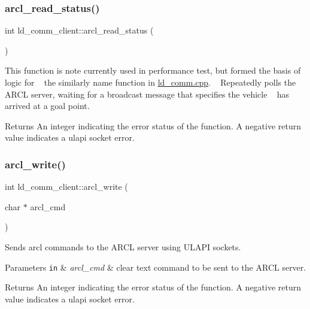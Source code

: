 \subsubsection{\texorpdfstring{arcl\+\_\+read\+\_\+status()}{arcl\_read\_status()}}
{\footnotesize\ttfamily int ld\+\_\+comm\+\_\+client\+::arcl\+\_\+read\+\_\+status (\begin{DoxyParamCaption}{ }\end{DoxyParamCaption})}

This function is note currently used in performance test, but formed the basis of logic for ~\newline
the similarly name function in \hyperlink{ld__comm_8cpp}{ld\+\_\+comm.\+cpp}. ~\newline
Repeatedly polls the A\+R\+CL server, waiting for a broadcast message that specifies the vehicle ~\newline
has arrived at a goal point. \begin{DoxyReturn}{Returns}
An integer indicating the error status of the function. A negative return value indicates a ulapi socket error. 
\end{DoxyReturn}
\mbox{\label{classld__comm__client_af044c54c00fe8b8f1528eb094b11ad88}} 
\subsubsection{\texorpdfstring{arcl\+\_\+write()}{arcl\_write()}}
{\footnotesize\ttfamily int ld\+\_\+comm\+\_\+client\+::arcl\+\_\+write (\begin{DoxyParamCaption}\item[{char $\ast$}]{arcl\+\_\+cmd }\end{DoxyParamCaption})}

Sends arcl commands to the A\+R\+CL server using U\+L\+A\+PI sockets. 
\begin{DoxyParams}[1]{Parameters}
\mbox{\tt in}  & {\em arcl\+\_\+cmd} & clear text command to be sent to the A\+R\+CL server. \\
\hline
\end{DoxyParams}
\begin{DoxyReturn}{Returns}
An integer indicating the error status of the function. A negative return value indicates a ulapi socket error. 
\end{DoxyReturn}
\mbox{\label{classld__comm__client_a254638599da673cf2f376166a8f9b984}} 
